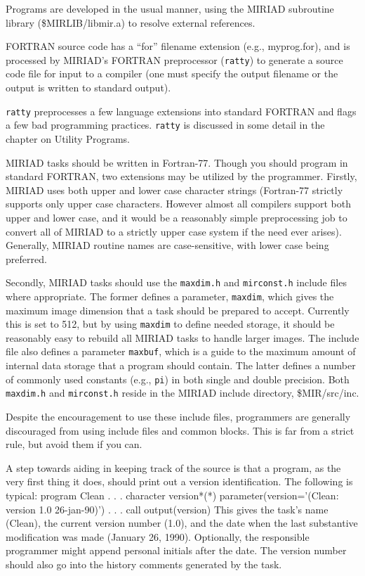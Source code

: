 
Programs are developed in the usual manner, using the MIRIAD
subroutine library (\$MIRLIB/libmir.a) to resolve external references.

FORTRAN source code has a ``for'' filename extension (e.g., myprog.for),
and is processed by MIRIAD's FORTRAN preprocessor ({\tt ratty}) to
generate a source code file for input to a compiler (one must specify
the output filename or the output is written to standard output).

{\tt ratty} preprocesses a few language extensions into standard FORTRAN
and flags a few bad programming practices.  {\tt ratty} is discussed in some
detail in the chapter on Utility Programs.

MIRIAD tasks should be written in Fortran-77.  Though you should
program in standard FORTRAN, two extensions may be utilized by
the programmer. Firstly, MIRIAD uses both upper and lower case
character strings (Fortran-77 strictly supports only upper case characters.
However almost all compilers support both upper and lower case, and it
would be a reasonably simple preprocessing job to convert all of
MIRIAD to a strictly upper case system if the need ever arises).
Generally, MIRIAD routine names are case-sensitive, with lower case
being preferred.

Secondly, MIRIAD tasks should use the {\tt maxdim.h} and
{\tt mirconst.h} include files where appropriate.  The former defines a
parameter, {\tt maxdim}, which gives the maximum image dimension that a
task should be prepared to accept. Currently this is set to 512, but
by using {\tt maxdim} to define needed storage, it should be reasonably
easy to rebuild all MIRIAD tasks to handle larger images.  The
include file also defines a parameter {\tt maxbuf}, which is a guide to
the maximum amount of internal data storage that a program should contain.
The latter defines a number of commonly used constants (e.g., {\tt pi}) in both
single and double precision.  Both {\tt maxdim.h} and {\tt mirconst.h}
reside in the MIRIAD include directory, \$MIR/src/inc.

Despite the encouragement to use these include files, programmers are
generally discouraged from using include files and common blocks. This
is far from a strict rule, but avoid them if you can.

A step towards aiding in keeping track of the source is that a program,
as the very first thing it does, should print out a version identification.
The following is typical:
{\ninepoint\begintt
       program Clean
          .
          .
          .
       character version*(*)
       parameter(version='(Clean: version 1.0 26-jan-90)')
          .
          .
          .
       call output(version)
\endtt}
This gives the task's name (Clean), the current version number (1.0),
and the date when the last substantive modification was made
(January 26, 1990).  Optionally, the responsible programmer might append
personal initials after the date.  The version number should also go
into the history comments generated by the task.
